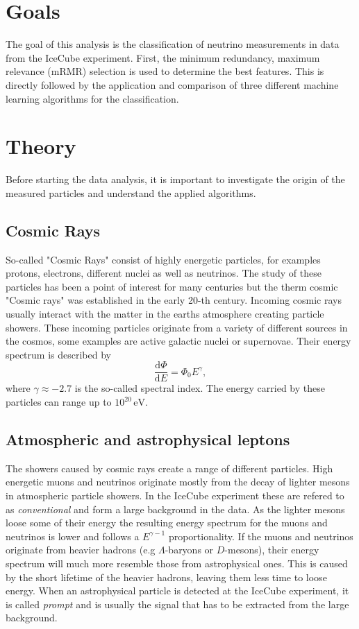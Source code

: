 \section{Goals}
The goal of this analysis is the classification of neutrino measurements in data from the IceCube experiment. 
First, the minimum redundancy, maximum relevance (mRMR) selection is used to determine the best features.
This is directly followed by the application and comparison of three different machine learning algorithms for the classification.


\section{Theory}
\label{sec:Theory}
Before starting the data analysis, it is important to investigate the origin of the measured particles and understand the applied algorithms. 

\subsection{Cosmic Rays}
So-called "Cosmic Rays" consist of highly energetic particles, for examples protons, electrons, different nuclei as well as neutrinos. 
The study of these particles has been a point of interest for many centuries but the therm cosmic "Cosmic rays" was established in the early 20-th century. 
Incoming cosmic rays usually interact with the matter in the earths atmosphere creating particle showers. 
These incoming particles originate from a variety of different sources in the cosmos, some examples are active galactic nuclei or supernovae.
Their energy spectrum is described by
\begin{equation*}
	\frac{\mathrm{d}\Phi}{\mathrm{d}E} = \Phi_0 E^\gamma,
\end{equation*}
where $\gamma \approx -2.7$ is the so-called spectral index. 
The energy carried by these particles can range up to $10^{20}\,\unit{\eV}$.


\subsection{Atmospheric and astrophysical leptons}
The showers caused by cosmic rays create a range of different particles. 
High energetic muons and neutrinos originate mostly from the decay of lighter mesons in atmospheric particle showers. 
In the IceCube experiment these are refered to as \textit{conventional} and form a large background in the data.
As the lighter mesons loose some of their energy the resulting energy spectrum for the muons 
and neutrinos is lower and follows a $E^{\gamma-1}$ proportionality. 
If the muons and neutrinos originate from heavier hadrons 
(e.g $\Lambda$-baryons or $D$-mesons), their energy spectrum will much more resemble those from astrophysical ones. 
This is caused by the short lifetime of the heavier hadrons, leaving them less time to loose energy.
When an astrophysical particle is detected at the IceCube experiment, it is called \textit{prompt} and is
usually the signal that has to be extracted from the large background.

